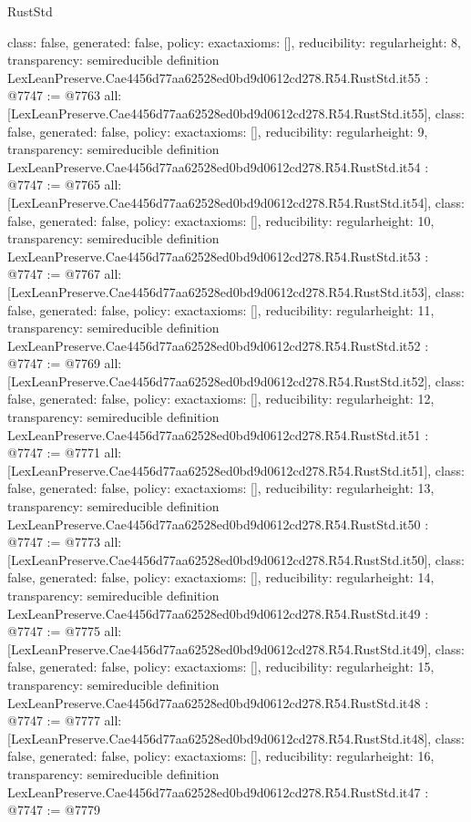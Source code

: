 \begin{lexlean}{RustStd}
\begin{coremodule}
{  class: false,
  generated: false,
  policy: exact{axioms: []},
  reducibility: regular{height: 8},
  transparency: semireducible
}
definition LexLeanPreserve.Cae4456d77aa62528ed0bd9d0612cd278.R54.RustStd.it55 : @7747 := @7763 {
  all: [LexLeanPreserve.Cae4456d77aa62528ed0bd9d0612cd278.R54.RustStd.it55],
  class: false,
  generated: false,
  policy: exact{axioms: []},
  reducibility: regular{height: 9},
  transparency: semireducible
}
definition LexLeanPreserve.Cae4456d77aa62528ed0bd9d0612cd278.R54.RustStd.it54 : @7747 := @7765 {
  all: [LexLeanPreserve.Cae4456d77aa62528ed0bd9d0612cd278.R54.RustStd.it54],
  class: false,
  generated: false,
  policy: exact{axioms: []},
  reducibility: regular{height: 10},
  transparency: semireducible
}
definition LexLeanPreserve.Cae4456d77aa62528ed0bd9d0612cd278.R54.RustStd.it53 : @7747 := @7767 {
  all: [LexLeanPreserve.Cae4456d77aa62528ed0bd9d0612cd278.R54.RustStd.it53],
  class: false,
  generated: false,
  policy: exact{axioms: []},
  reducibility: regular{height: 11},
  transparency: semireducible
}
definition LexLeanPreserve.Cae4456d77aa62528ed0bd9d0612cd278.R54.RustStd.it52 : @7747 := @7769 {
  all: [LexLeanPreserve.Cae4456d77aa62528ed0bd9d0612cd278.R54.RustStd.it52],
  class: false,
  generated: false,
  policy: exact{axioms: []},
  reducibility: regular{height: 12},
  transparency: semireducible
}
definition LexLeanPreserve.Cae4456d77aa62528ed0bd9d0612cd278.R54.RustStd.it51 : @7747 := @7771 {
  all: [LexLeanPreserve.Cae4456d77aa62528ed0bd9d0612cd278.R54.RustStd.it51],
  class: false,
  generated: false,
  policy: exact{axioms: []},
  reducibility: regular{height: 13},
  transparency: semireducible
}
definition LexLeanPreserve.Cae4456d77aa62528ed0bd9d0612cd278.R54.RustStd.it50 : @7747 := @7773 {
  all: [LexLeanPreserve.Cae4456d77aa62528ed0bd9d0612cd278.R54.RustStd.it50],
  class: false,
  generated: false,
  policy: exact{axioms: []},
  reducibility: regular{height: 14},
  transparency: semireducible
}
definition LexLeanPreserve.Cae4456d77aa62528ed0bd9d0612cd278.R54.RustStd.it49 : @7747 := @7775 {
  all: [LexLeanPreserve.Cae4456d77aa62528ed0bd9d0612cd278.R54.RustStd.it49],
  class: false,
  generated: false,
  policy: exact{axioms: []},
  reducibility: regular{height: 15},
  transparency: semireducible
}
definition LexLeanPreserve.Cae4456d77aa62528ed0bd9d0612cd278.R54.RustStd.it48 : @7747 := @7777 {
  all: [LexLeanPreserve.Cae4456d77aa62528ed0bd9d0612cd278.R54.RustStd.it48],
  class: false,
  generated: false,
  policy: exact{axioms: []},
  reducibility: regular{height: 16},
  transparency: semireducible
}
definition LexLeanPreserve.Cae4456d77aa62528ed0bd9d0612cd278.R54.RustStd.it47 : @7747 := @7779 {
}
\end{coremodule}
\end{lexlean}
